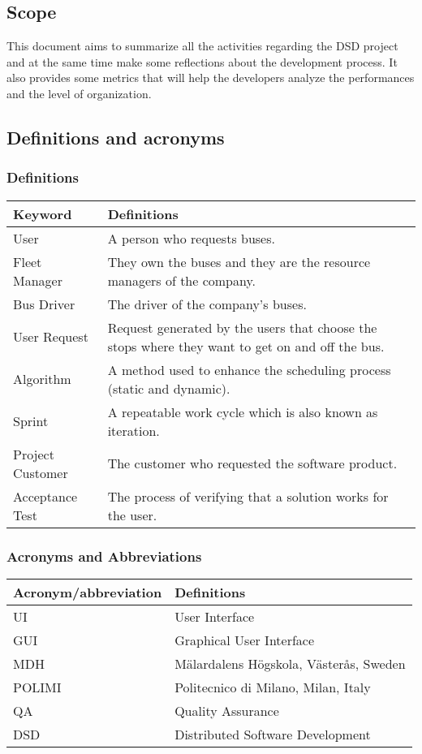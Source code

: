 \subsection{Scope}
This document aims to summarize all the activities regarding the DSD project and at the same time make some reflections about the development process. It also provides some metrics that will help the developers analyze the performances and the level of organization. 

\subsection{Definitions and acronyms} 
\subsubsection{Definitions}
\begin{center}
	\begin{tabular} { | m{3.5cm} | m{9.5cm} | }
		\hline
		\textbf{Keyword} & \textbf{Definitions}\\
		\hline
		User & A person who requests buses.\\
		\hline
		Fleet Manager & They own the buses and they are the resource managers of the company.\\
		\hline
		Bus Driver & The driver of the company's buses.\\
		\hline
		User Request & Request generated by the users that choose the stops where they want to get on and off the bus.\\
		\hline
		Algorithm & A method used to enhance the scheduling process (static and dynamic).\\
		\hline
		Sprint & A repeatable work cycle which is also known as iteration.\\
		\hline
		Project Customer & The customer who requested the software product.\\
		\hline
		Acceptance Test & The process of verifying that a solution works for the user.\\
		\hline
	\end{tabular}
\end{center}

\subsubsection{Acronyms and Abbreviations}
\begin{center}
	\begin{tabular} { | m{5cm} | m{8cm} | }
		\hline
		\textbf{Acronym/abbreviation} & \textbf{Definitions}\\
		\hline
		UI & User Interface\\
		\hline
		GUI & Graphical User Interface\\
		\hline
		MDH & M\"{a}lardalens H\"{o}gskola, V\"{a}ster\r{a}s, Sweden\\
		\hline
		POLIMI & Politecnico di Milano, Milan, Italy\\
		\hline
		QA & Quality Assurance\\
		\hline
		DSD & Distributed Software Development\\
		\hline
	\end{tabular}
\end{center}
\newpage
